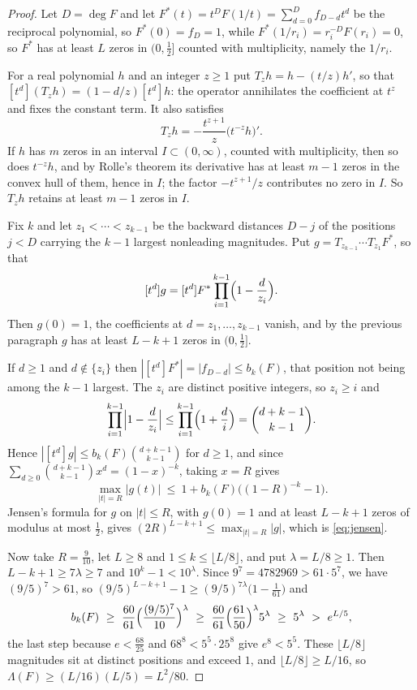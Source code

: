 \documentclass[11pt]{article}
\begin{document}
\begin{proof}
Let $D=\deg F$ and let $F^*(t)=t^DF(1/t)=\sum_{d=0}^Df_{D-d}t^d$ be the
reciprocal polynomial, so $F^*(0)=f_D=1$, while
$F^*(1/r_i)=r_i^{-D}F(r_i)=0$, so $F^*$ has at least $L$ zeros in $(0,\tfrac12]$ counted with multiplicity,
namely the $1/r_i$.

For a real polynomial $h$ and an integer $z\ge1$ put $T_zh=h-(t/z)h'$, so that
$[t^d](T_zh)=(1-d/z)[t^d]h$: the operator annihilates the coefficient at
$t^z$ and fixes the constant term.  It also satisfies
\[
  T_zh=-\frac{t^{z+1}}z\bigl(t^{-z}h\bigr)' .
\]
If $h$ has $m$ zeros in an interval $I\subset(0,\infty)$, counted with
multiplicity, then so does $t^{-z}h$, and by Rolle's theorem its derivative
has at least $m-1$ zeros in the convex hull of them, hence in $I$; the factor
$-t^{z+1}/z$ contributes no zero in $I$.  So $T_zh$ retains at least $m-1$
zeros in $I$.

Fix $k$ and let $z_1<\cdots<z_{k-1}$ be the backward distances $D-j$ of the
positions $j<D$ carrying the $k-1$ largest nonleading magnitudes.  Put
$g=T_{z_{k-1}}\cdots T_{z_1}F^*$, so that
\[
  [t^d]g=[t^d]F^*\prod_{i=1}^{k-1}\Bigl(1-\frac d{z_i}\Bigr).
\]
Then $g(0)=1$, the coefficients at $d=z_1,\ldots,z_{k-1}$ vanish, and by the
previous paragraph $g$ has at least $L-k+1$ zeros in $(0,\tfrac12]$.

If $d\ge1$ and $d\notin\{z_i\}$ then $|[t^d]F^*|=|f_{D-d}|\le b_k(F)$, that
position not being among the $k-1$ largest.  The $z_i$ are distinct positive
integers, so $z_i\ge i$ and
\[
  \prod_{i=1}^{k-1}\Bigl|1-\frac d{z_i}\Bigr|
  \le\prod_{i=1}^{k-1}\Bigl(1+\frac di\Bigr)=\binom{d+k-1}{k-1} .
\]
Hence $|[t^d]g|\le b_k(F)\binom{d+k-1}{k-1}$ for $d\ge1$, and since
$\sum_{d\ge0}\binom{d+k-1}{k-1}x^d=(1-x)^{-k}$, taking $x=R$ gives
\[
  \max_{|t|=R}|g(t)|\ \le\ 1+b_k(F)\bigl((1-R)^{-k}-1\bigr).
\]
Jensen's formula for $g$ on $|t|\le R$, with $g(0)=1$ and at least
$L-k+1$ zeros of modulus at most $\tfrac12$, gives
$(2R)^{L-k+1}\le\max_{|t|=R}|g|$, which is \eqref{eq:jensen}.

Now take $R=\tfrac9{10}$, let $L\ge8$ and $1\le k\le\lfloor L/8\rfloor$,
and put $\lambda=L/8\ge1$.  Then $L-k+1\ge7\lambda\ge7$ and $10^k-1<10^\lambda$.
Since $9^7=4782969>61\cdot5^7$, we have $(9/5)^7>61$, so
$(9/5)^{L-k+1}-1\ge(9/5)^{7\lambda}\bigl(1-\tfrac1{61}\bigr)$ and
\[
  b_k(F)\ \ge\ \frac{60}{61}\Bigl(\frac{(9/5)^7}{10}\Bigr)^{\lambda}
  \ \ge\ \frac{60}{61}\Bigl(\frac{61}{50}\Bigr)^{\lambda}5^\lambda\ \ge\ 5^\lambda\ >\ e^{L/5},
\]
the last step because $e<\tfrac{68}{25}$ and $68^8<5^5\cdot25^8$ give $e^8<5^5$.  These $\lfloor L/8\rfloor$
magnitudes sit at distinct positions and exceed $1$, and
$\lfloor L/8\rfloor\ge L/16$, so $\Lambda(F)\ge(L/16)(L/5)=L^2/80$.
\end{proof}
\end{document}
